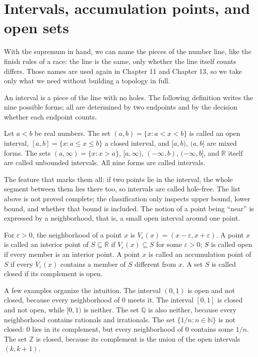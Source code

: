 \section{Intervals, accumulation points, and open sets}

With the supremum in hand, we can name the pieces of the number line, like the finish
rules of a race: the line is the same, only whether the line itself counts differs.
Those names are used again in Chapter 11 and Chapter 13, so we take only what we need
without building a topology in full.

An interval is a piece of the line with no holes. The following definition writes the
nine possible forms; all are determined by two endpoints and by the decision whether
each endpoint counts.

\begin{definisi}[Interval]
Let $a<b$ be real numbers. The set $(a,b)=\{x: a<x<b\}$ is called an open interval,
$[a,b]=\{x: a\le x\le b\}$ a closed interval, and $[a,b)$, $(a,b]$ are mixed forms. The
sets $(a,\infty)=\{x: x>a\}$, $[a,\infty)$, $(-\infty,b)$,
$(-\infty,b]$, and $\mathbb{R}$ itself are called unbounded intervals. All nine forms
are called intervals.
\end{definisi}

The feature that marks them all: if two points lie in the interval, the whole segment
between them lies there too, so intervals are called hole-free. The list above is not
proved complete; the classification only inspects upper bound, lower bound, and whether
that bound is included. The notion of a point being ``near'' is expressed by a
neighborhood, that is, a small open interval around one point.

\begin{definisi}
For $\varepsilon>0$, the neighborhood of a point $x$ is
$V_\varepsilon(x)=(x-\varepsilon,x+\varepsilon)$. A point $x$ is called an interior
point of $S\subseteq\mathbb{R}$ if $V_\varepsilon(x)\subseteq S$ for some
$\varepsilon>0$; $S$ is called open if every member is an interior point. A point $x$ is
called an accumulation point of $S$ if every $V_\varepsilon(x)$ contains a member of
$S$ different from $x$. A set $S$ is called closed if its complement is open.
\end{definisi}

A few examples organize the intuition. The interval $(0,1)$ is open and not closed,
because every neighborhood of $0$ meets it. The interval $[0,1]$ is closed and not open,
while $[0,1)$ is neither. The set $\mathbb{Q}$ is also neither, because every
neighborhood contains rationals and irrationals. The set $\{1/n:n\in\mathbb{N}\}$ is not
closed: $0$ lies in its complement, but every neighborhood of $0$ contains some $1/n$.
The set $\mathbb{Z}$ is closed, because its complement is the union of the open
intervals $(k,k+1)$.

